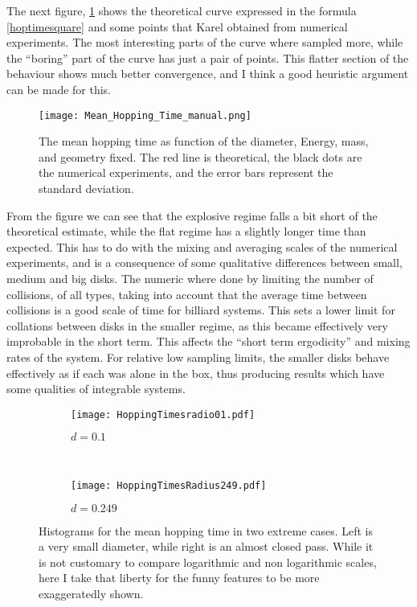 \documentclass[a4paper,10pt]{article}
\begin{document}
The next figure, \ref{MeanHopp01} shows the theoretical curve 
expressed in the formula \ref{hoptimesquare} and some points
that Karel obtained from numerical experiments. The most interesting
parts of the curve where sampled more, while the ``boring'' part
of the curve has just a pair of points. This flatter section of
the behaviour shows much better convergence, and I think a
good heuristic argument can be made for this.

\begin{figure}[h]
  \centering
  \texttt{[image: Mean\_Hopping\_Time\_manual.png]}
  \caption{The mean hopping time as function of the diameter, Energy, mass, and geometry fixed.
The red line is theoretical, the black dots are the numerical experiments, and the error bars
represent the standard deviation.}\label{MeanHopp01}
\end{figure}

From the figure we can see that the explosive regime falls a bit short of
the theoretical estimate, while  the flat regime has a slightly longer
time than expected. This has to do with the mixing and averaging scales
of the numerical experiments, and is a consequence of some
qualitative differences between small, medium and big disks. The numeric where done
by limiting the number of collisions, of all types, taking into account
that the average time between collisions is a good scale of time
for billiard systems. This sets a lower limit for collations between
disks in the smaller regime, as this became effectively very
improbable in the short term. This affects the ``short term ergodicity'' and
mixing rates of the system. For relative low sampling limits, the
smaller disks behave effectively as if each was alone in the box, thus
producing results which have some qualities of integrable systems. 

\begin{figure}[h]
        \centering
        \begin{subfigure}[b]{0.45\textwidth}
                \centering
                \texttt{[image: HoppingTimesradio01.pdf]}
                \caption{$d=0.1$}
                \label{smallradious}
        \end{subfigure}%
        ~ %
        \begin{subfigure}[b]{0.45\textwidth}
                \centering
                \texttt{[image: HoppingTimesRadius249.pdf]}
                \caption{$d=0.249$}
                \label{bigradious}
        \end{subfigure}       
        \caption{Histograms for the mean hopping time
in two extreme cases. Left is a very small diameter, while right is an almost
closed pass. While it is not customary to compare logarithmic and non
logarithmic scales, here I take that liberty for the funny features to be
more exaggeratedly shown.}\label{histohopps}
\end{figure}
\end{document}
